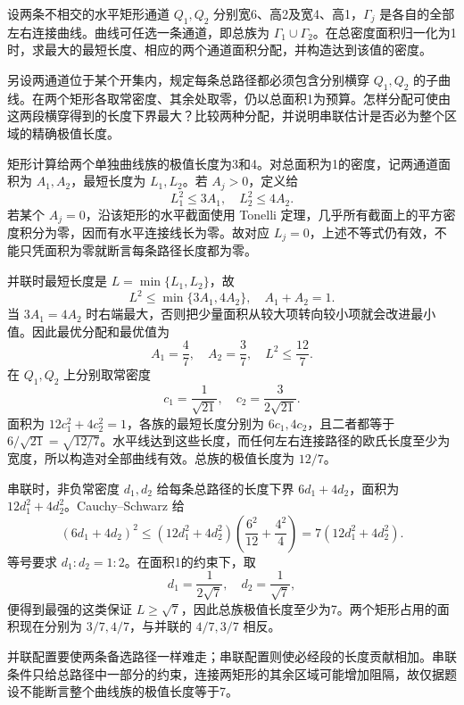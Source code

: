 \begin{exercise}\label{b3:ex:08-4}
设两条不相交的水平矩形通道 \(Q_1,Q_2\) 分别宽6、高2及宽4、高1，\(\Gamma_j\) 是各自的全部左右连接曲线。曲线可任选一条通道，即总族为 \(\Gamma_1\cup\Gamma_2\)。在总密度面积归一化为1时，求最大的最短长度、相应的两个通道面积分配，并构造达到该值的密度。

\ProseParagraphBreak

另设两通道位于某个开集内，规定每条总路径都必须包含分别横穿 \(Q_1,Q_2\) 的子曲线。在两个矩形各取常密度、其余处取零，仍以总面积1为预算。怎样分配可使由这两段横穿得到的长度下界最大？比较两种分配，并说明串联估计是否必为整个区域的精确极值长度。
\end{exercise}
\begin{solution}
矩形计算给两个单独曲线族的极值长度为3和4。对总面积为1的密度，记两通道面积为 \(A_1,A_2\)，最短长度为 \(L_1,L_2\)。若 \(A_j>0\)，定义给
\[
 L_1^2\le3A_1,\quad L_2^2\le4A_2.
\]
若某个 \(A_j=0\)，沿该矩形的水平截面使用 Tonelli 定理，几乎所有截面上的平方密度积分为零，因而有水平连接线长为零。故对应 \(L_j=0\)，上述不等式仍有效，不能只凭面积为零就断言每条路径长度都为零。

并联时最短长度是 \(L=\min\{L_1,L_2\}\)，故
\[
 L^2\le\min\{3A_1,4A_2\},\quad A_1+A_2=1.
\]
当 \(3A_1=4A_2\) 时右端最大，否则把少量面积从较大项转向较小项就会改进最小值。因此最优分配和最优值为
\[
 A_1=\frac47,\quad A_2=\frac37,\quad L^2\le\frac{12}{7}.
\]
在 \(Q_1,Q_2\) 上分别取常密度
\[
 c_1=\frac1{\sqrt{21}},\quad c_2=\frac3{2\sqrt{21}}.
\]
面积为 \(12c_1^2+4c_2^2=1\)，各族的最短长度分别为 \(6c_1,4c_2\)，且二者都等于 \(6/\sqrt{21}=\sqrt{12/7}\)。水平线达到这些长度，而任何左右连接路径的欧氏长度至少为宽度，所以构造对全部曲线有效。总族的极值长度为 \(12/7\)。

串联时，非负常密度 \(d_1,d_2\) 给每条总路径的长度下界 \(6d_1+4d_2\)，面积为 \(12d_1^2+4d_2^2\)。Cauchy--Schwarz 给
\[
 (6d_1+4d_2)^2
 \le(12d_1^2+4d_2^2)
 \left(\frac{6^2}{12}+\frac{4^2}{4}\right)
 =7(12d_1^2+4d_2^2).
\]
等号要求 \(d_1:d_2=1:2\)。在面积1的约束下，取
\[
 d_1=\frac1{2\sqrt7},\quad d_2=\frac1{\sqrt7},
\]
便得到最强的这类保证 \(L\ge\sqrt7\)，因此总族极值长度至少为7。两个矩形占用的面积现在分别为 \(3/7,4/7\)，与并联的 \(4/7,3/7\) 相反。

并联配置要使两条备选路径一样难走；串联配置则使必经段的长度贡献相加。串联条件只给总路径中一部分的约束，连接两矩形的其余区域可能增加阻隔，故仅据题设不能断言整个曲线族的极值长度等于7。
\end{solution}

